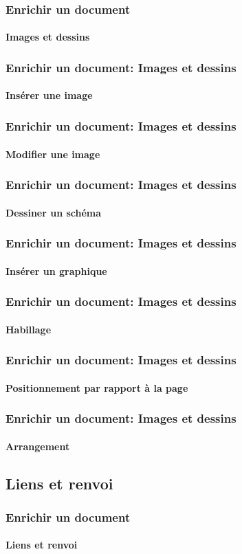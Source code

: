 \documentclass[xcolor=table]{beamer}
\begin{document}
\begin{frame}
\frametitle{Enrichir un document}
\framesubtitle{Images et dessins}

\end{frame}

\begin{frame}
\frametitle{Enrichir un document: Images et dessins}
\framesubtitle{Insérer une image}

\end{frame}

\begin{frame}
\frametitle{Enrichir un document: Images et dessins}
\framesubtitle{Modifier une image}

\end{frame}

\begin{frame}
\frametitle{Enrichir un document: Images et dessins}
\framesubtitle{Dessiner un schéma}

\end{frame}

\begin{frame}
\frametitle{Enrichir un document: Images et dessins}
\framesubtitle{Insérer un graphique}

\end{frame}

\begin{frame}
\frametitle{Enrichir un document: Images et dessins}
\framesubtitle{Habillage}

\end{frame}

\begin{frame}
\frametitle{Enrichir un document: Images et dessins}
\framesubtitle{Positionnement par rapport à la page}

\end{frame}

\begin{frame}
\frametitle{Enrichir un document: Images et dessins}
\framesubtitle{Arrangement}

\end{frame}

\subsection{Liens et renvoi}

\begin{frame}
\frametitle{Enrichir un document}
\framesubtitle{Liens et renvoi}

\end{frame}
\end{document}
